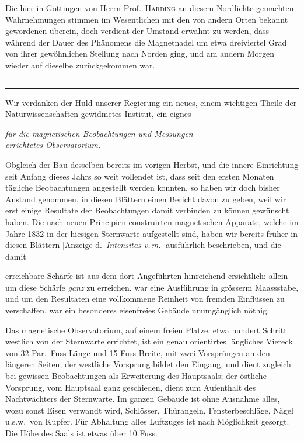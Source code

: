Die hier in Göttingen von Herrn Prof.\ \textsc{Harding} an diesem Nordlichte gemachten Wahrnehmungen stimmen im Wesentlichen mit den von andern Orten bekannt gewordenen überein, doch verdient der Umstand erwähnt zu werden, dass während der Dauer des Phänomens die Magnetnadel um etwa dreiviertel Grad von ihrer gewöhnlichen Stellung nach Norden ging, und am andern Morgen wieder auf dieselbe zurückgekommen war.

\par\vspace{.084\textheight}
\begin{center}
\rule{.625\linewidth}{.35pt}\par
{}\par
\rule{.625\linewidth}{.35pt}
\end{center}
Wir verdanken der Huld unserer Regierung ein neues, einem wichtigen Theile der Naturwissenschaften gewidmetes Institut, ein eignes
\begin{center}\itshape
für die magnetischen Beobachtungen und Messungen\\
errichtetes Observatorium.
\end{center}

Obgleich der Bau desselben bereits im vorigen Herbst, und die innere Einrichtung seit Anfang dieses Jahrs so weit vollendet ist, dass seit den ersten Monaten tägliche Beobachtungen angestellt werden konnten, so haben wir doch bisher Anstand genommen, in diesen Blättern einen Bericht davon zu geben, weil wir erst einige Resultate der Beobachtungen damit verbinden zu können gewünscht haben. Die nach neuen Principien construirten magnetischen Apparate, welche im Jahre 1832 in der hiesigen Sternwarte aufgestellt sind, haben wir bereits früher in diesen Blättern [Anzeige d.\ \textit{Intensitas v.\,m.}] ausführlich beschrieben, und die damit
\par\clearpage
{}
\noindent erreichbare Schärfe ist aus dem dort Angeführten hinreichend ersichtlich: allein um diese Schärfe \textit{ganz} zu erreichen, war eine Ausführung in grösserm Maassstabe, und um den Resultaten eine vollkommene Reinheit von fremden Einflüssen zu verschaffen, war ein besonderes eisenfreies Gebäude unumgänglich nöthig.

Das magnetische Observatorium, auf einem freien Platze, etwa hundert Schritt westlich von der Sternwarte errichtet, ist ein genau orientirtes längliches Viereck von 32 Par.\ Fuss Länge und 15 Fuss Breite, mit zwei Vorsprüngen an den längeren Seiten; der westliche Vorsprung bildet den Eingang, und dient zugleich bei gewissen Beobachtungen als Erweiterung des Hauptsaals; der östliche Vorsprung, vom Hauptsaal ganz geschieden, dient zum Aufenthalt des Nachtwächters der Sternwarte. Im ganzen Gebäude ist ohne Ausnahme alles, wozu sonst Eisen verwandt wird, Schlösser, Thürangeln, Fensterbeschläge, Nägel u.s.w.\ von Kupfer. Für Abhaltung alles Luftzuges ist nach Möglichkeit gesorgt. Die Höhe des Saals ist etwas über 10 Fuss.

